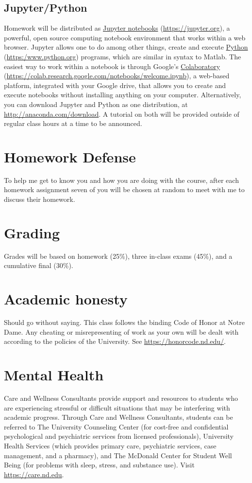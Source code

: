 \documentclass[11pt]{article}
\begin{document}
\subsection{Jupyter/Python}
\label{sec:orgfa3e4c2}
Homework will be distributed as \href{https://jupyter.org/}{Jupyter notebooks} (\url{https://jupyter.org}), a powerful, open source computing notebook environment that works within a web browser. Jupyter allows one to do among other things, create and execute \href{https://www.python.org/}{Python} (\url{https:/www.python.org}) programs, which are similar in syntax to Matlab. The easiest way to work within a notebook is through Google's \href{https://colab.research.google.com/notebooks/welcome.ipynb}{Colaboratory} (\url{https://colab.research.google.com/notebooks/welcome.ipynb}), a web-based platform, integrated with your Google drive, that allows you to create and execute notebooks without installing anything on your computer. Alternatively, you can download Jupyter and Python as one distribution, at \url{http://anaconda.com/download}. A tutorial on both will be provided outside of regular class hours at a time to be announced.
\section{Homework Defense}
\label{sec:orgc83eba7}
To help me get to know you and how you are doing with the course, after each homework assignment seven of you will be chosen at random to meet with me to discuss their homework.

\section{Grading}
\label{sec:orgc3274d5}
Grades will be based on homework (25\%), three in-class exams (45\%), and a cumulative final (30\%).

\section{Academic honesty}
\label{sec:org5629b6c}
Should go without saying. This class follows the binding Code of Honor
at Notre Dame.  Any cheating or misrepresenting of work as your own
will be dealt with according to the policies of the University.  See \url{https://honorcode.nd.edu/}.

\section{Mental Health}
\label{sec:org8918a67}
Care and Wellness Consultants provide
support and resources to students who are experiencing stressful or difficult
situations that may be interfering with academic progress. Through Care and
Wellness Consultants, students can be referred to The University Counseling
Center (for cost-free and confidential psychological and psychiatric services from
licensed professionals), University Health Services (which provides primary care,
psychiatric services, case management, and a pharmacy), and The McDonald
Center for Student Well Being (for problems with sleep, stress, and substance
use). Visit \url{https://care.nd.edu}.
\end{document}
